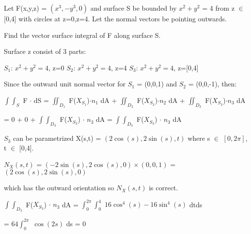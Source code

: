     \vspace{0.5cm}



    \begin{example}
        Let F(x,y,z) = $(x^3,-y^3,0)$ and surface S be bounded by
        $x^2+y^2$ = 4 from z $\in$ [0,4] with circles at z=0,z=4.
        Let the normal vectors be pointing outwards.

        Find the vector surface integral of F along surface S.
    \end{example}

    \begin{tbox}
        Surface z consist of 3 parts:
        
        \hspace{0.5cm}
        $S_1$: $x^2+y^2=4$, z=0
        \hspace{0.5cm}
        $S_2$: $x^2+y^2=4$, z=4
        \hspace{0.5cm}
        $S_3$: $x^2+y^2=4$, z=[0,4]

        Since the outward unit normal vector for $S_1$ = (0,0,1)
        and $S_2$ = (0,0,-1), then:

        \hspace{0.5cm}
        $\int \int_S$ F $\cdot$ dS
        = $\iint_{D_1}$ F($X_{S_1}$)$\cdot$$n_1$ dA
            + $\iint_{D_2}$ F($X_{S_2}$)$\cdot$$n_2$ dA
            + $\iint_{D_3}$ F($X_{S_3}$)$\cdot$$n_3$ dA
        
        \hspace{0.5cm}
        = 0 + 0 + $\int \int_{D_3}$ F($X_{S_3}$) $\cdot$ $n_3$ dA
        = $\int \int_{D_3}$ F($X_{S_3}$) $\cdot$ $n_3$ dA

        $S_3$ can be parametrized X(s,t) = $(2\cos(s),2\sin(s),t)$
        where s $\in$ $[0,2\pi]$, t $\in$ [0,4].

        \hspace{0.5cm}
        $N_X(s,t)$
        = $(-2\sin(s),2\cos(s),0) \times (0,0,1)$
        = $(2\cos(s),2\sin(s),0)$

        which has the outward orientation so $N_X(s,t)$ is correct.

        \hspace{0.5cm}
        $\int \int_{D_3}$ F($X_{S_3}$) $\cdot$ $n_3$ dA
        = $\int_0^{2\pi} \int_0^4$ $16\cos^4(s) - 16\sin^4(s)$ dtds

        \hspace{4.5cm}
        = $64 \int_0^{2\pi}$ $\cos(2s)$ ds = 0
    \end{tbox}

